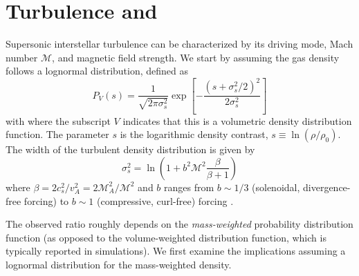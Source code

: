 %



\section{Turbulence and \formaldehyde}
Supersonic interstellar turbulence can be characterized by its driving mode,
Mach number $\mathcal{M}$, and magnetic field strength. 
We start by assuming the gas density follows a lognormal distribution, defined
as 
\begin{equation}
    \label{eqn:lognormal}
    P_V(s) = \frac{1}{\sqrt{2 \pi \sigma_s^2}} \exp\left[-\frac{(s+\sigma_s^2/2)^2}{2 \sigma_s^2}\right]
\end{equation}
\citep{Padoan2011b,Molina2012a}
with where the subscript $V$ indicates that this is a volumetric density
distribution function.  The parameter $s$ is the logarithmic
density contrast, $s\equiv\ln(\rho/\rho_0)$.
The width of the turbulent density distribution
is given by
\begin{equation}
    \label{eqn:sigmas}
    \sigma_s^2 = \ln\left(1+b^2 \mathcal{M}^2 \frac{\beta}{\beta+1}\right)
\end{equation}
where $\beta= 2 c_s^2/v_A^2 = 2 \mathcal{M}_A^2/\mathcal{M}^2$ and $b$ ranges
from $b\sim1/3$ (solenoidal, divergence-free forcing) to $b\sim1$ (compressive, curl-free)
forcing \citep{Federrath2010a}.  


The observed \formaldehyde ratio roughly depends on the \emph{mass-weighted}
probability distribution function (as opposed to the volume-weighted
distribution function, which is typically reported in simulations).  We first
examine the implications assuming a lognormal distribution for the
mass-weighted density.

